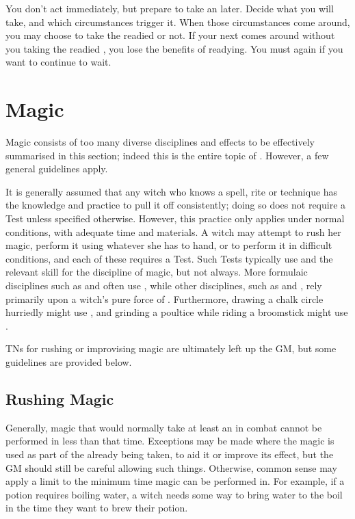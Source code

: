 You don't act immediately, but prepare to take an {\action} later.
Decide what {\action} you will take, and which circumstances trigger it.
When those circumstances come around, you may choose to take the readied {\action} or not.
If your next {\turn} comes around without you taking the readied {\action}, you lose the benefits of readying.
You must  again if you want to continue to wait.

\section{Magic}

Magic consists of too many diverse disciplines and effects to be effectively summarised in this section; indeed this is the entire topic of .
However, a few general guidelines apply.

It is generally assumed that any witch who knows a spell, rite or technique has the knowledge and practice to pull it off consistently; doing so does not require a Test unless specified otherwise.
However, this practice only applies under normal conditions, with adequate time and materials.
A witch may attempt to rush her magic, perform it using whatever she has to hand, or to perform it in difficult conditions, and each of these requires a Test.
Such Tests typically use  and the relevant skill for the discipline of magic, but not always.
More formulaic disciplines such as  and  often use , while other disciplines, such as  and , rely primarily upon a witch's pure force of .
Furthermore, drawing a chalk circle hurriedly might use , and grinding a poultice while riding a broomstick might use .

TNs for rushing or improvising magic are ultimately left up the GM, but some guidelines are provided below.

\subsection{Rushing Magic}

Generally, magic that would normally take at least an {\action} in combat cannot be performed in less than that time.
Exceptions may be made where the magic is used as part of the {\action} already being taken, to aid it or improve its effect, but the GM should still be careful allowing such things.
Otherwise, common sense may apply a limit to the minimum time magic can be performed in.
For example, if a potion requires boiling water, a witch needs some way to bring water to the boil in the time they want to brew their potion.

